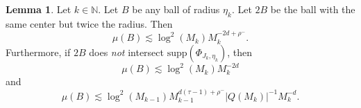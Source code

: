 \documentclass{amsart}
\numberwithin{equation}{section}
\theoremstyle{definition}
\newtheorem{lemma}[theorem]{Lemma}
\theoremstyle{definition}
\def\NN{\mathbb{N}}
\def\supp{\mathrm{supp}}
\begin{document}
\begin{lemma}\label{k-ball regularity}
Let $k \in \NN$. Let $B$ be any ball of radius $\eta_k$. 
Let $2B$ be the ball with the same center but twice the radius. 
Then 
\begin{equation} \label{mu(B)-3}
\mu(B) \lesssim \log^2(M_k) 
M_k^{-2d+\rho^-}.
\end{equation}
Furthermore, if $2B$ does \textit{not} intersect $\supp(\Phi_{J_k,\eta_k})$, then 
\begin{equation} \label{mu(B)-1}
\mu(B) \lesssim \log^2(M_k) M_k^{-2d}
\end{equation}
and
\begin{equation}\label{mu(B)-2}
\mu(B) \lesssim \log^2(M_{k-1}) 
M_{k-1}^{d(\tau-1)+\rho^-}
|Q(M_k)|^{-1} M_k^{-d}.
\end{equation}
\end{lemma}
\end{document}
